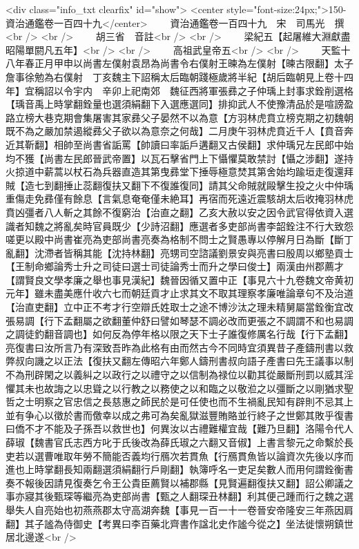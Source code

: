 <div class="info_txt clearfix" id="show">
<center style="font-size:24px;">150-資治通鑑卷一百四十九</center>
  　　資治通鑑卷一百四十九　宋　司馬光　撰<br />
<br />
　　胡三省　音註<br />
<br />
　　梁紀五【起屠維大淵獻盡昭陽單閼凡五年】<br />
<br />
　　高祖武皇帝五<br />
<br />
　　天監十八年春正月甲申以尚書左僕射袁昂為尚書令右僕射王暕為左僕射【暕古限翻】太子詹事徐勉為右僕射　丁亥魏主下詔稱太后臨朝踐極歲將半紀【胡后臨朝見上卷十四年】宜稱詔以令宇内　辛卯上祀南郊　魏征西將軍張彞之子仲瑀上封事求銓削選格【瑀音禹上時掌翻銓量也選須絹翻下入選應選同】排抑武人不使豫清品於是喧謗盈路立榜大巷克期會集屠害其家彞父子晏然不以為意【方羽林虎賁立榜克期之初魏朝既不為之嚴加禁遏縱彞父子欲以為意奈之何哉】二月庚午羽林虎賁近千人【賁音奔近其靳翻】相帥至尚書省詬罵【帥讀曰率詬戶遘翻又古侯翻】求仲瑀兄左民郎中始均不獲【尚書左民郎晉武帝置】以瓦石擊省門上下懾懼莫敢禁討【懾之涉翻】遂持火掠道中薪蒿以杖石為兵器直造其第曳彞堂下捶辱極意焚其第舍始均踰垣走復還拜賊【造七到翻捶止蕊翻復扶又翻下不復誰復同】請其父命賊就毆擊生投之火中仲瑀重傷走免彞僅有餘息【言氣息奄奄僅未絶耳】再宿而死遠近震駭胡太后收掩羽林虎賁凶彊者八人斬之其餘不復窮治【治直之翻】乙亥大赦以安之因令武官得依資入選識者知魏之將亂矣時官員既少【少詩沼翻】應選者多吏部尚書李韶銓注不行大致怨嗟更以殿中尚書崔亮為吏部尚書亮奏為格制不問士之賢愚專以停解月日為斷【斷丁亂翻】沈滯者皆稱其能【沈持林翻】亮甥司空諮議劉景安與亮書曰殷周以鄉塾貢士【王制命鄉論秀士升之司徒曰選士司徒論秀士而升之學曰俊士】兩漢由州郡薦才【謂賢良文學孝廉之舉也事見漢紀】魏晉因循又置中正【事見六十九卷魏文帝黄初元年】雖未盡美應什收六七而朝廷貢才止求其文不取其理察孝廉唯論章句不及治道【治直吏翻】立中正不考才行空辯氏姓取士之途不博沙汰之理未精舅屬當銓衡宜改張易調【行下孟翻屬之欲翻董仲舒曰譬如琴瑟不調必改而更張之不調謂不和也易調之調徒釣翻音調也】如何反為停年格以限之天下士子誰復修厲名行哉【行下孟翻】亮復書曰汝所言乃有深致吾昨為此格有由而然古今不同時宜須異昔子產鑄刑書以救弊叔向譏之以正法【復扶又翻左傳昭六年鄭人鑄刑書叔向語子產書曰先王議事以制不為刑辟閑之以義糾之以政行之以禮守之以信制為禄位以勸其從嚴斷刑罰以威其淫懼其未也故誨之以忠聳之以行教之以務使之以和臨之以敬涖之以彊斷之以剛猶求聖哲之士明察之官忠信之長慈惠之師民於是可任使也而不生禍亂民知有辟則不忌其上並有争心以徵於書而儌幸以成之弗可為矣亂獄滋豐賄賂並行終子之世鄭其敗乎復書曰僑不才不能及子孫吾以救世也】何異汝以古禮難權宜哉【難乃旦翻】洛陽令代人薛琡【魏書官氏志西方叱于氏後改為薛氏琡之六翻又音俶】上書言黎元之命繫於長吏若以選曹唯取年勞不簡能否義均行鴈次若貫魚【行鴈貫魚皆以論資次先後以序而進也上時掌翻長知兩翻選須絹翻行戶剛翻】執簿呼名一吏足矣數人而用何謂銓衡書奏不報後因請見復奏乞令王公貴臣薦賢以補郡縣【見賢遍翻復扶又翻】詔公卿議之事亦寢其後甄琛等繼亮為吏部尚書【甄之人翻琛丑林翻】利其便己踵而行之魏之選舉失人自亮始也初燕燕郡太守高湖奔魏【事見一百一十一卷晉安帝隆安三年燕因肩翻】其子謐為侍御史【考異曰李百藥北齊書作諡北史作謐今從之】坐法徙懷朔鎮世居北邊遂<br />
